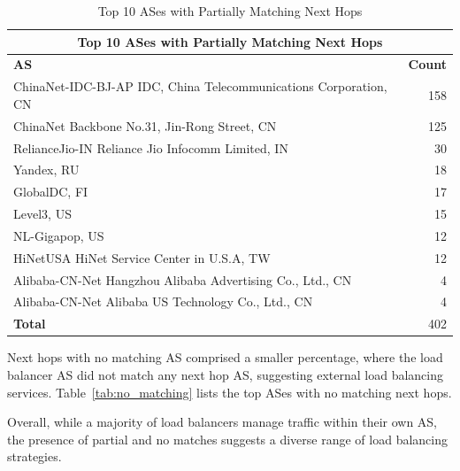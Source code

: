 \documentclass[12pt]{cwru_thesis}
\begin{document}
\begin{table}[h!]
    \centering
    \begin{tabular}{|l|r|}
        \hline
        \multicolumn{2}{|c|}{\textbf{Top 10 ASes with Partially Matching Next Hops}} \\
        \hline
        \textbf{AS} & \textbf{Count} \\
        \hline
        ChinaNet-IDC-BJ-AP IDC, China Telecommunications Corporation, CN & 158 \\
        ChinaNet Backbone No.31, Jin-Rong Street, CN & 125 \\
        RelianceJio-IN Reliance Jio Infocomm Limited, IN & 30 \\
        Yandex, RU & 18 \\
        GlobalDC, FI & 17 \\
        Level3, US & 15 \\
        NL-Gigapop, US & 12 \\
        HiNetUSA HiNet Service Center in U.S.A, TW & 12 \\
        Alibaba-CN-Net Hangzhou Alibaba Advertising Co., Ltd., CN & 4 \\
        Alibaba-CN-Net Alibaba US Technology Co., Ltd., CN & 4 \\
        \hline
        \textbf{Total} & 402 \\
        \hline
    \end{tabular}
    \caption{Top 10 ASes with Partially Matching Next Hops}
    \label{tab:partially_matching}
\end{table}

Next hops with no matching AS comprised a smaller percentage, where the load balancer AS did not match any next hop AS, suggesting external load balancing services. Table~\ref{tab:no_matching} lists the top ASes with no matching next hops.

Overall, while a majority of load balancers manage traffic within their own AS, the presence of partial and no matches suggests a diverse range of load balancing strategies.
\end{document}
